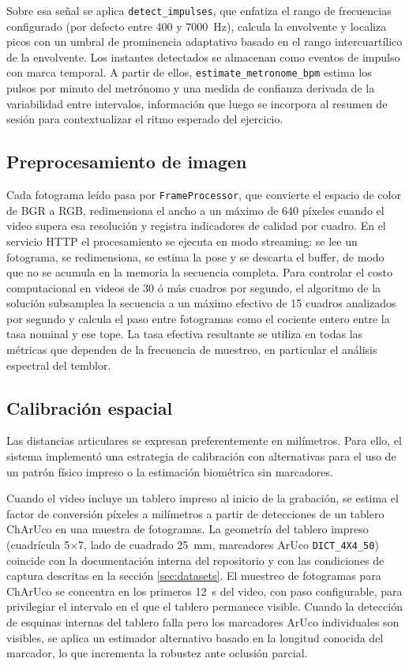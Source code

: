 Sobre esa señal se aplica \texttt{detect\_impulses}, que enfatiza el rango de frecuencias configurado (por defecto entre 400 y 7000~Hz), calcula la envolvente y localiza picos con un umbral de prominencia adaptativo basado en el rango intercuartílico de la envolvente. Los instantes detectados se almacenan como eventos de impulso con marca temporal. A partir de ellos, \texttt{estimate\_metronome\_bpm} estima los pulsos por minuto del metrónomo y una medida de confianza derivada de la variabilidad entre intervalos, información que luego se incorpora al resumen de sesión para contextualizar el ritmo esperado del ejercicio.

\vspace{-\parskip}%
\subsection{Preprocesamiento de imagen}

Cada fotograma leído pasa por \texttt{FrameProcessor}, que convierte el espacio de color de BGR a RGB, redimensiona el ancho a un máximo de 640 píxeles cuando el video supera esa resolución y registra indicadores de calidad por cuadro. En el servicio HTTP el procesamiento se ejecuta en modo streaming: se lee un fotograma, se redimensiona, se estima la pose y se descarta el buffer, de modo que no se acumula en la memoria la secuencia completa. Para controlar el costo computacional en videos de 30 ó más cuadros por segundo, el algoritmo de la solución subsamplea la secuencia a un máximo efectivo de 15 cuadros analizados por segundo y calcula el paso entre fotogramas como el cociente entero entre la tasa nominal y ese tope. La tasa efectiva resultante se utiliza en todas las métricas que dependen de la frecuencia de muestreo, en particular el análisis espectral del temblor.

\subsection{Calibración espacial}

Las distancias articulares se expresan preferentemente en milímetros. Para ello, el sistema implementó una estrategia de calibración con alternativas para el uso de un patrón físico impreso o la estimación biométrica sin marcadores.

Cuando el video incluye un tablero impreso al inicio de la grabación, se estima el factor de conversión píxeles a milímetros a partir de detecciones de un tablero ChArUco en una muestra de fotogramas. La geometría del tablero impreso (cuadrícula 5$\times$7, lado de cuadrado 25~mm, marcadores ArUco \texttt{DICT\_4X4\_50}) coincide con la documentación interna del repositorio y con las condiciones de captura descritas en la sección \ref{sec:datasets}. El muestreo de fotogramas para ChArUco se concentra en los primeros 12~s del video, con paso configurable, para privilegiar el intervalo en el que el tablero permanece visible. Cuando la detección de esquinas internas del tablero falla pero los marcadores ArUco individuales son visibles, se aplica un estimador alternativo basado en la longitud conocida del marcador, lo que incrementa la robustez ante oclusión parcial.

